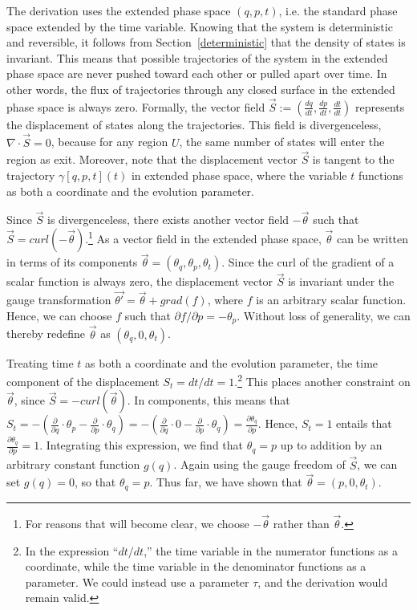 \documentclass[12pt, twoside]{article}
\renewcommand{\vector}[1]{\ensuremath{\vec{#1}}} %
\begin{document}
The derivation uses the extended phase space $(q, p, t)$, i.e. the standard phase space extended by the time variable. Knowing that the system is deterministic and reversible, it follows from Section~\ref{deterministic} that the density of states is invariant. This means that possible trajectories of the system in the extended phase space are never pushed toward each other or pulled apart over time. In other words, the flux of trajectories through any closed surface in the extended phase space is always zero. Formally, the vector field $\vec{S} := (\frac{d q }{d t }, \frac{d p }{d t }, \frac{d t }{d t })$ represents the displacement of states along the trajectories. This field is divergenceless, $\nabla \cdot \vector{S} = 0$, because for any region $U$, the same number of states will enter the region as exit. Moreover, note that the displacement vector $\vec{S}$ is tangent to the trajectory $\gamma [q, p, t] (t)$ in extended phase space, where the variable $t$ functions as both a coordinate and the evolution parameter.

Since $\vector{S}$ is divergenceless, there exists another vector field $-\vector{\theta}$ such that $\vector{S} = curl(-\vector{\theta} )$.\footnote{For reasons that will become clear, we choose $-\vector{\theta}$ rather than $\vector{\theta}$.} As a vector field in the extended phase space, $\vector{\theta}$ can be written in terms of its components $\vector{\theta} = (\theta_q, \theta_p, \theta_t) $. Since the curl of the gradient of a scalar function is always zero, the displacement vector $\vector{S}$ is invariant under the gauge transformation $\vector{\theta'} =\vector{\theta} + grad(f)$, where $f$ is an arbitrary scalar function. Hence, we can choose $f$ such that $\partial f/ \partial p = -\theta_p $. Without loss of generality, we can thereby redefine $\vector{\theta}$ as $(\theta_q, 0, \theta_t) $.

Treating time $t$ as both a coordinate and the evolution parameter, the time component of the displacement $S_t = dt/ dt = 1$.\footnote{In the expression ``$dt/dt$,'' the time variable in the numerator functions as a coordinate, while the time variable in the denominator functions as a parameter. We could instead use a parameter $\tau$, and the derivation would remain valid.} This places another constraint on $\vector{\theta} $, since $\vector{S} = -curl(\vector{\theta}) $. In components, this means that $S_t = - (\frac{\partial}{\partial q} \cdot \theta_p - \frac{\partial}{\partial p} \cdot \theta_q) = - (\frac{\partial}{\partial q} \cdot 0 - \frac{\partial}{\partial p} \cdot \theta_q) = \frac{\partial \theta_q}{\partial p}$. Hence, $S_t = 1$ entails that $\frac{\partial \theta_q}{\partial p} = 1$. Integrating this expression, we find that $\theta_q = p$ up to addition by an arbitrary constant function $g(q)$. Again using the gauge freedom of $\vector{S}$, we can set $g(q)=0$, so that $\theta_q = p$. Thus far, we have shown that $\vector{\theta} = (p, 0,\theta_t) $.
\end{document}
